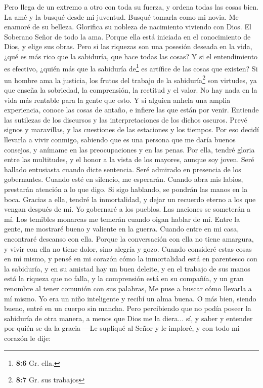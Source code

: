  Pero llega de un extremo a otro con toda su fuerza, y
ordena todas las cosas bien.  La amé y la busqué desde mi
juventud. Busqué tomarla como mi novia. Me enamoré de su belleza.
 Glorifica su nobleza de nacimiento viviendo con Dios. El
Soberano Señor de todo la ama.  Porque ella está iniciada
en el conocimiento de Dios, y elige sus obras.  Pero si
las riquezas son una posesión deseada en la vida, ¿qué es más rico que
la sabiduría, que hace todas las cosas?  Y si el
entendimiento es efectivo, ¿quién más que la sabiduría de\footnote{\textbf{8:6}
  Gr. ella.} es artífice de las cosas que existen?  Si un
hombre ama la justicia, los frutos del trabajo de la
sabiduría\footnote{\textbf{8:7} Gr. sus trabajos} son virtudes, ya que
enseña la sobriedad, la comprensión, la rectitud y el valor. No hay nada
en la vida más rentable para la gente que esto.  Y si
alguien anhela una amplia experiencia, conoce las cosas de antaño, e
infiere las que están por venir. Entiende las sutilezas de los discursos
y las interpretaciones de los dichos oscuros. Prevé signos y maravillas,
y las cuestiones de las estaciones y los tiempos.  Por eso
decidí llevarla a vivir conmigo, sabiendo que es una persona que me
daría buenos consejos, y anímame en las preocupaciones y en las penas.
 Por ella, tendré gloria entre las multitudes, y el honor
a la vista de los mayores, aunque soy joven.  Seré
hallado entusiasta cuando dicte sentencia. Seré admirado en presencia de
los gobernantes.  Cuando esté en silencio, me esperarán.
Cuando abra mis labios, prestarán atención a lo que digo. Si sigo
hablando, se pondrán las manos en la boca.  Gracias a
ella, tendré la inmortalidad, y dejar un recuerdo eterno a los que
vengan después de mí.  Yo gobernaré a los pueblos. Las
naciones se someterán a mí.  Los temibles monarcas me
temerán cuando oigan hablar de mí. Entre la gente, me mostraré bueno y
valiente en la guerra.  Cuando entre en mi casa,
encontraré descanso con ella. Porque la conversación con ella no tiene
amargura, y vivir con ella no tiene dolor, sino alegría y gozo.
 Cuando consideré estas cosas en mí mismo, y pensé en mi
corazón cómo la inmortalidad está en parentesco con la sabiduría,
 y en su amistad hay un buen deleite, y en el trabajo de
sus manos está la riqueza que no falla, y la comprensión está en su
compañía, y un gran renombre al tener comunión con sus palabras, Me puse
a buscar cómo llevarla a mí mismo.  Yo era un niño
inteligente y recibí un alma buena.  O más bien, siendo
bueno, entré en un cuerpo sin mancha.  Pero percibiendo
que no podía poseer la sabiduría de otra manera, a menos que Dios me la
diera... sí, y saber y entender por quién se da la gracia ---Le supliqué
al Señor y le imploré, y con todo mi corazón le dije:

